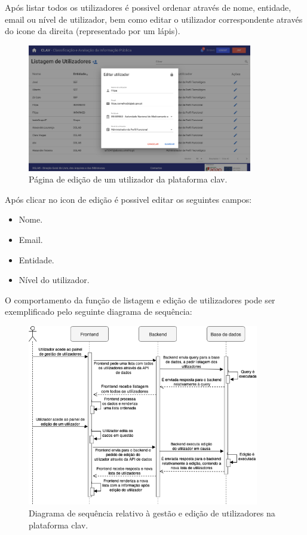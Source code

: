 \vspace{-5mm}
Após listar todos os utilizadores é possivel ordenar através de nome, entidade, email ou nível de utilizador, bem como editar o utilizador correspondente através do icone da direita (representado por um lápis).
\vspace{-4mm}
\begin{figure}[H]
    \centering
    \includegraphics[width=0.875\textwidth]{img/clav/gestao/edicao.png}
    \caption{Página de edição de um utilizador da plataforma \gls{clav}.}
    \label{fig:pagEdicaoUtilizador}
\end{figure}

Após clicar no icon de edição é possivel editar os seguintes campos:

\begin{itemize}
    \item Nome.
    \item Email.
    \item Entidade.
    \item Nível do utilizador.
\end{itemize}

O comportamento da função de listagem e edição de utilizadores pode ser exemplificado pelo seguinte diagrama de sequência:

\begin{figure}[H]
    \centering
    \includegraphics[width=0.9\textwidth]{img/diagramas/sequencia/DiagramasSequencia-GestaoUtilizadores.png}
    \caption{Diagrama de sequência relativo à gestão e edição de utilizadores na plataforma \gls{clav}.}
    \label{fig:diagramaSequenciaGestaoUtilizadores}
\end{figure}

